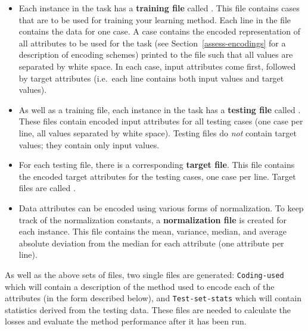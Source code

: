 \begin{itemize}
\item 
    Each instance in the task has a \textbf{training file} called
    .  This file contains cases that are to be used for
    training your learning method.  Each line in the file contains the
    data for one case.  A case contains the encoded representation of
    all attributes to be used for the task (see
    Section~\ref{assess-encodings} for a description of encoding
    schemes) printed to the file such that all values are separated by
    white space.  In each case, input attributes come first, followed
    by target attributes (i.e.~each line contains both input values
    and target values).
\item
    As well as a training file, each instance in the task has a
    \textbf{testing file} called .  These files contain
    encoded input attributes for all testing cases (one case per line,
    all values separated by white space).  Testing files do \emph{not}
    contain target values; they contain only input values.
\item
    For each testing file, there is a corresponding \textbf{target
    file}.  This file contains the encoded target attributes for the
    testing cases, one case per line. Target files are called
    .
\item
    Data attributes can be encoded using various forms of
    normalization.  To keep track of the normalization constants, a
    \textbf{normalization file}  is created for
    each instance.  This file contains the mean, variance, median, and
    average absolute deviation from the median for each attribute (one
    attribute per line).
\end{itemize}\vspace{-5pt}

As well as the above sets of files, two single files are generated:
\texttt{Coding-used} which will contain a description of the method
used to encode each of the attributes (in the form described below),
and \texttt{Test-set-stats} which will contain statistics derived from
the testing data.  These files are needed to calculate the losses and
evaluate the method performance after it has been run.

